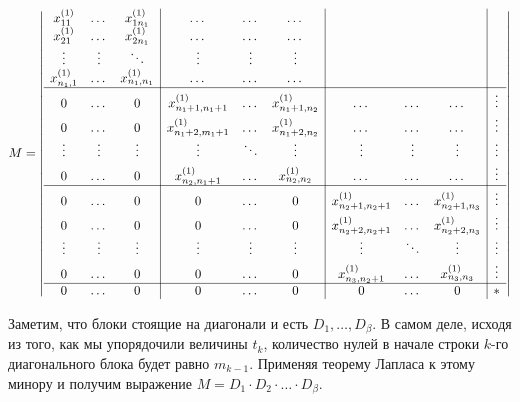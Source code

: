 \documentclass[11pt, a4paper]{article}
\begin{document}
$$M = \left|\begin{array}{c c c | c c c | c c c | c}
    x_{11}^{(1)} & \dots & x_{1n_1}^{(1)} & \dots & \dots & \dots & & & &\\
    x_{21}^{(1)} & \dots & x_{2n_1}^{(1)} & \dots & \dots & \dots & & & &\\
    \vdots & \vdots & \ddots & \vdots & \vdots & \vdots & & & &\\
    x_{n_1,1}^{(1)} & \dots & x_{n_1,n_1}^{(1)} & \dots & \dots & \dots & & &\\
    \hline
    0 & \dots & 0 & x_{n_1 + 1, n_1 + 1}^{(1)} & \dots & x_{n_1 + 1, n_2}^{(1)} & \dots & \dots & \dots & \vdots\\
    0 & \dots & 0 & x_{n_1 + 2, m_1 + 1}^{(1)} & \dots & x_{n_1 + 2, n_2}^{(1)} & \dots & \dots & \dots & \vdots\\
    \vdots & \vdots & \vdots & \vdots & \ddots & \vdots & \vdots & \vdots & \vdots & \vdots \\
    0 & \dots & 0 & x_{n_2, n_1 + 1}^{(1)} & \dots & x_{n_2, n_2}^{(1)} & \dots & \dots & \dots & \vdots\\
    \hline
    0 & \dots & 0 & 0 & \dots & 0 &  x_{n_2 + 1, n_2 + 1}^{(1)} & \dots & x_{n_2 + 1, n_3}^{(1)} & \vdots\\
    0 & \dots & 0 & 0 & \dots & 0 &  x_{n_2 + 2, n_2 + 1}^{(1)} & \dots & x_{n_2 + 2, n_3}^{(1)} & \vdots\\
    \vdots & \vdots & \vdots & \vdots & \vdots & \vdots & \vdots & \ddots & \vdots & \vdots \\
    0 & \dots & 0 & 0 & \dots & 0 &  x_{n_3, n_2 + 1}^{(1)} & \dots & x_{n_3, n_3}^{(1)} & \vdots\\
    \hline
    0 & \dots & 0 & 0 & \dots & 0 &  0 & \dots & 0 & \ast\\

\end{array}\right|$$

Заметим, что блоки стоящие на диагонали и есть $D_1, \dots, D_{\beta}$. В самом деле, исходя из того, как мы упорядочили величины $t_k$, количество нулей в начале строки
$k$-го диагонального блока будет равно $m_{k-1}$. Применяя теорему Лапласа к этому минору и получим выражение $M = D_1 \cdot D_2 \cdot \ldots \cdot D_{\beta}$.
\end{document}
